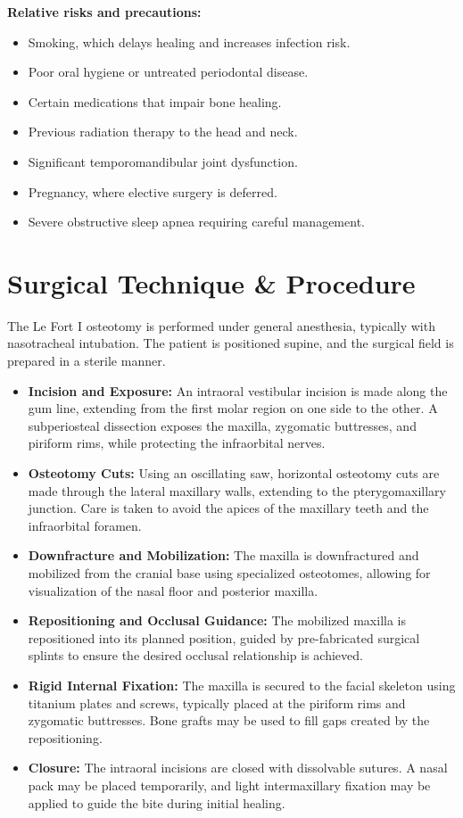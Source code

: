 \textbf{Relative risks and precautions:}
\begin{itemize}
  \item Smoking, which delays healing and increases infection risk.
  \item Poor oral hygiene or untreated periodontal disease.
  \item Certain medications that impair bone healing.
  \item Previous radiation therapy to the head and neck.
  \item Significant temporomandibular joint dysfunction.
  \item Pregnancy, where elective surgery is deferred.
  \item Severe obstructive sleep apnea requiring careful management.
\end{itemize}

\section*{Surgical Technique \& Procedure}
The Le Fort I osteotomy is performed under general anesthesia, typically with nasotracheal intubation. The patient is positioned supine, and the surgical field is prepared in a sterile manner.

\begin{itemize}
  \item \textbf{Incision and Exposure:} An intraoral vestibular incision is made along the gum line, extending from the first molar region on one side to the other. A subperiosteal dissection exposes the maxilla, zygomatic buttresses, and piriform rims, while protecting the infraorbital nerves.
  
  \item \textbf{Osteotomy Cuts:} Using an oscillating saw, horizontal osteotomy cuts are made through the lateral maxillary walls, extending to the pterygomaxillary junction. Care is taken to avoid the apices of the maxillary teeth and the infraorbital foramen.
  
  \item \textbf{Downfracture and Mobilization:} The maxilla is downfractured and mobilized from the cranial base using specialized osteotomes, allowing for visualization of the nasal floor and posterior maxilla.
  
  \item \textbf{Repositioning and Occlusal Guidance:} The mobilized maxilla is repositioned into its planned position, guided by pre-fabricated surgical splints to ensure the desired occlusal relationship is achieved.
  
  \item \textbf{Rigid Internal Fixation:} The maxilla is secured to the facial skeleton using titanium plates and screws, typically placed at the piriform rims and zygomatic buttresses. Bone grafts may be used to fill gaps created by the repositioning.
  
  \item \textbf{Closure:} The intraoral incisions are closed with dissolvable sutures. A nasal pack may be placed temporarily, and light intermaxillary fixation may be applied to guide the bite during initial healing.
\end{itemize}


